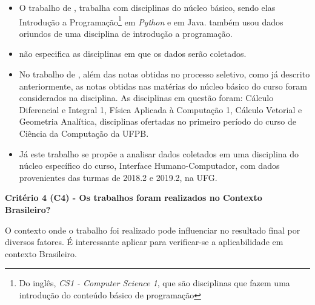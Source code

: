 \documentclass[
	12pt,				%
	openright,			%
	oneside,
	a4paper,			%
	english,			%
	french,				%
	spanish,			%
	brazil,				%
	]{abntex2}
\begin{document}
\begin{itemize}
    \item O trabalho de , trabalha com disciplinas do núcleo básico, sendo elas Introdução a Programação\footnote[4]{Do inglês, \textit{CS1 - Computer Science 1}, que são disciplinas que fazem uma introdução do conteúdo básico de programação} em \textit{Python} e em Java.  também usou dados oriundos de uma disciplina de introdução a programação.
    \item {} não especifica as disciplinas em que os dados serão coletados.
    \item No trabalho de , além das notas obtidas no processo seletivo, como já descrito anteriormente, as notas obtidas nas matérias do núcleo básico do curso foram considerados na disciplina. As disciplinas em questão foram: Cálculo Diferencial e Integral 1, Física Aplicada à Computação 1, Cálculo Vetorial e Geometria Analítica, disciplinas ofertadas no primeiro período do curso de Ciência da Computação da UFPB.
    \item Já este trabalho se propõe a analisar dados coletados em uma disciplina do núcleo específico do curso, Interface Humano-Computador, com dados provenientes das turmas de 2018.2 e 2019.2, na UFG.
\end{itemize}

\textbf{Critério 4 (C4) - Os trabalhos foram realizados no Contexto Brasileiro?}

O contexto onde o trabalho foi realizado pode influenciar no resultado final por diversos fatores. É interessante aplicar para verificar-se a aplicabilidade em contexto Brasileiro.
\end{document}
